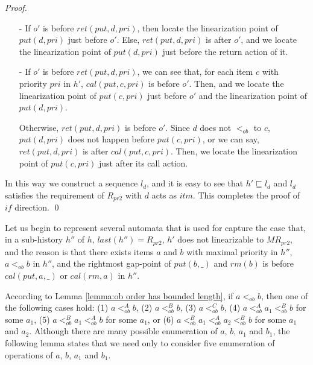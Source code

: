 \begin {proof}
\begin{itemize}
\item[-] If $o'$ is before $\textit{ret}(\textit{put},d,\textit{pri})$, then locate the linearization point of $\textit{put}(d,\textit{pri})$ just before $o'$. Else, $\textit{ret}(\textit{put},d,\textit{pri})$ is after $o'$, and we locate the linearization point of $\textit{put}(d,\textit{pri})$ just before the return action of it.

\item[-] If $o'$ is before $\textit{ret}(\textit{put},d,\textit{pri})$, we can see that, for each item $c$ with priority $\textit{pri}$ in $h'$, $\textit{cal}(\textit{put},c,\textit{pri})$ is before $o'$. Then, and we locate the linearization point of $\textit{put}(c,\textit{pri})$ just before $o'$ and the linearization point of $\textit{put}(d,\textit{pri})$.

    Otherwise, $\textit{ret}(\textit{put},d,\textit{pri})$ is before $o'$. Since $d$ does not $<_{\textit{ob}}$ to $c$, $\textit{put}(d,\textit{pri})$ does not happen before $\textit{put}(c,\textit{pri})$, or we can say, $\textit{ret}(\textit{put},d,\textit{pri})$ is after $\textit{cal}(\textit{put},c,\textit{pri})$. Then, we locate the linearization point of $\textit{put}(c,\textit{pri})$ just after its call action.
\end{itemize}

In this way we construct a sequence $l_d$, and it is easy to see that $h' \sqsubseteq l_d$ and $l_d$ satisfies the requirement of $R_{\textit{pr2}}$ with $d$ acts as $\textit{itm}$. This completes the proof of $\textit{if}$ direction. \qed
\end {proof}

Let us begin to represent several automata that is used for capture the case that, in a sub-history $h''$ of $h$, $\textit{last}(h'') = R_{\textit{pr2}}$, $h'$ does not linearizable to $\textit{MR}_{\textit{pr2}}$, and the reason is that there exists items $a$ and $b$ with maximal priority in $h''$, $a <_{\textit{ob}} b$ in $h''$, and the rightmost gap-point of $\textit{put}(b,\_)$ and $\textit{rm}(b)$ is before $\textit{cal}(\textit{put},a,\_)$ or $\textit{cal}(\textit{rm},a)$ in $h''$.

According to Lemma \ref{lemma:ob order has bounded length}, if $a <_{\textit{ob}} b$, then one of the following cases hold: (1) $a <_{\textit{ob}}^A b$, (2) $a <_{\textit{ob}}^B b$, (3) $a <_{\textit{ob}}^C b$, (4) $a <_{\textit{ob}}^A a_1 <_{\textit{ob}}^B b$ for some $a_1$, (5) $a <_{\textit{ob}}^B a_1 <_{\textit{ob}}^A b$ for some $a_1$, or (6) $a <_{\textit{ob}}^B a_1 <_{\textit{ob}}^A a_2 <_{\textit{ob}}^B b$ for some $a_1$ and $a_2$. Although there are many possible enumeration of $a$, $b$, $a_1$ and $b_1$, the following lemma states that we need only to consider five enumeration of operations of $a$, $b$, $a_1$ and $b_1$.


